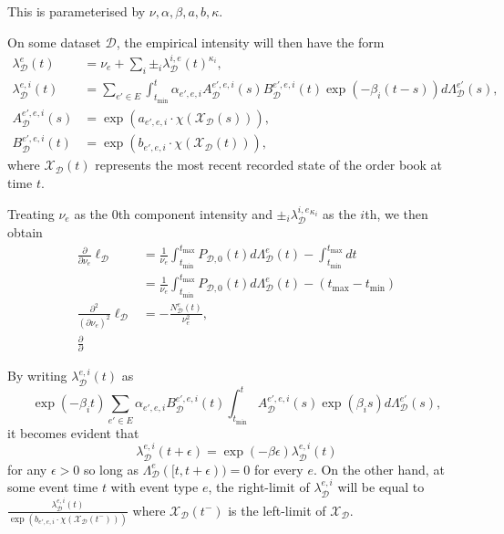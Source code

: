 \documentclass[honours,12pt]{unswthesis}
\numberwithin{equation}{section}
\begin{document}
This is parameterised by $\nu,\alpha,\beta,a,b,\kappa$.

On some dataset $\mathcal{D}$, the empirical intensity will then have the form
\begin{equation}
	\begin{align}
		\lambda_\mathcal{D}^e(t) &= \nu_e + \sum_i \pm_i \lambda_\mathcal{D}^{i,e}(t)^{\kappa_i}, \\
		\lambda_\mathcal{D}^{e,i}(t) &= \sum_{e'\in E}\int_{t_\mathrm{min}}^t \alpha_{e',e,i} A_\mathcal{D}^{e',e,i}(s) B_\mathcal{D}^{e',e,i}(t)\exp(-\beta_i(t-s))d\Lambda_\mathcal{D}^{e'}(s), \\
		A_\mathcal{D}^{e',e,i}(s) &= \exp(a_{e',e,i}\cdot\chi(\mathcal{X}_\mathcal{D}(s))), \\
		B_\mathcal{D}^{e',e,i}(t) &= \exp(b_{e',e,i}\cdot\chi(\mathcal{X}_\mathcal{D}(t))),
	\end{align}
\end{equation}
where $\mathcal{X}_\mathcal{D}(t)$ represents the most recent recorded state of the order book at time $t$.

Treating $\nu_e$ as the $0$th component intensity and $\pm_i \lambda_\mathcal{D}^{i,e}^{\kappa_i}$ as the $i$th, we then obtain
\begin{equation}
	\begin{align}
		\frac{\partial}{\partial \nu_e}\ell_\mathcal{D} &= \frac{1}{\nu_e} \int_{t_\mathrm{min}}^{t_\mathrm{max}} P_{\mathcal{D},0}(t)d\Lambda_\mathcal{D}^e(t) - \int_{t_\mathrm{min}}^{t_\mathrm{max}} dt \\
		&= \frac{1}{\nu_e} \int_{t_\mathrm{min}}^{t_\mathrm{max}} P_{\mathcal{D},0}(t)d\Lambda_\mathcal{D}^e(t) - (t_\mathrm{max}-t_\mathrm{min}) \\
		\frac{\partial^2}{(\partial \nu_e)^2}\ell_\mathcal{D} &= -\frac{N_\mathcal{D}^e(t)}{\nu_e^2}, \\
		\frac{\partial}{\partial}
	\end{align}
\end{equation}


By writing $\lambda_\mathcal{D}^{e,i}(t)$ as
$$\exp(-\beta_i t)\sum_{e'\in E}\alpha_{e',e,i} B_\mathcal{D}^{e',e,i}(t)\int_{t_\mathrm{min}}^t A_\mathcal{D}^{e',e,i}(s) \exp(\beta_i s)d\Lambda_\mathcal{D}^{e'}(s),$$
it becomes evident that 
$$\lambda_\mathcal{D}^{e,i}(t+\epsilon) = \exp(-\beta\epsilon) \lambda_\mathcal{D}^{e,i}(t)$$
for any $\epsilon>0$ so long as $\Lambda_\mathcal{D}^e([t,t+\epsilon))=0$ for every $e$.
On the other hand, at some event time $t$ with event type $e$, the right-limit of $\lambda_\mathcal{D}^{e,i}$ will be equal to
$\frac{\lambda_\mathcal{D}^{e,i}(t)}{\exp(b_{e',e,i}\cdot \chi(\mathcal{X}_\mathcal{D}(t^-)))}$
where $\mathcal{X}_\mathcal{D}(t^-)$ is the left-limit of $\mathcal{X}_\mathcal{D}$.
\end{document}
